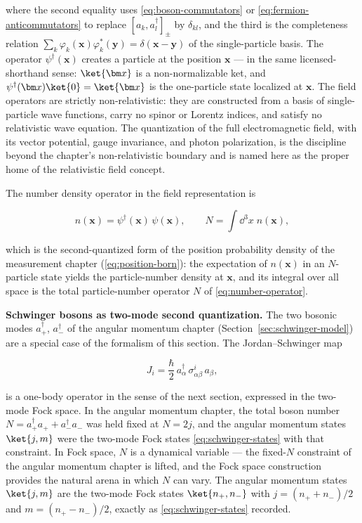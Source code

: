where the second equality uses \eqref{eq:boson-commutators} or \eqref{eq:fermion-anticommutators} to replace $[a_k, a_l^\dagger]_\pm$ by $\delta_{kl}$, and the third is the completeness relation $\sum_k \varphi_k(\bm x)\varphi_k^*(\bm y) = \delta(\bm x - \bm y)$ of the single-particle basis. The operator $\psi^\dagger(\bm x)$ creates a particle at the position $\bm x$ --- in the same licensed-shorthand sense: $\ket{\bm x}$ is a non-normalizable ket, and $\psi^\dagger(\bm x)\ket{0} = \ket{\bm x}$ is the one-particle state localized at $\bm x$. The field operators are strictly non-relativistic: they are constructed from a basis of single-particle wave functions, carry no spinor or Lorentz indices, and satisfy no relativistic wave equation. The quantization of the full electromagnetic field, with its vector potential, gauge invariance, and photon polarization, is the discipline beyond the chapter's non-relativistic boundary and is named here as the proper home of the relativistic field concept.

The number density operator in the field representation is
\begin{linenomath}
    \begin{equation}
        n(\bm x) = \psi^\dagger(\bm x)\,\psi(\bm x),
        \qquad
        N = \int\!\dd^3 x\;n(\bm x),
        \label{eq:density-operator-field}
    \end{equation}
\end{linenomath}
which is the second-quantized form of the position probability density of the measurement chapter (\eqref{eq:position-born}): the expectation of $n(\bm x)$ in an $N$-particle state yields the particle-number density at $\bm x$, and its integral over all space is the total particle-number operator $N$ of \eqref{eq:number-operator}.

\medskip\noindent\textbf{Schwinger bosons as two-mode second quantization.}
The two bosonic modes $a_+^\dagger$, $a_-^\dagger$ of the angular momentum chapter (Section~\ref{sec:schwinger-model}) are a special case of the formalism of this section. The Jordan--Schwinger map
\begin{linenomath}
    \begin{equation}
        J_i = \frac{\hbar}{2}\,a_\alpha^\dagger\,\sigma_{\alpha\beta}^i\,a_\beta,
        \label{eq:schwinger-revisited}
    \end{equation}
\end{linenomath}
is a one-body operator in the sense of the next section, expressed in the two-mode Fock space. In the angular momentum chapter, the total boson number $N = a_+^\dagger a_+ + a_-^\dagger a_-$ was held fixed at $N = 2j$, and the angular momentum states $\ket{j,m}$ were the two-mode Fock states \eqref{eq:schwinger-states} with that constraint. In Fock space, $N$ is a dynamical variable --- the fixed-$N$ constraint of the angular momentum chapter is lifted, and the Fock space construction provides the natural arena in which $N$ can vary. The angular momentum states $\ket{j,m}$ are the two-mode Fock states $\ket{n_+, n_-}$ with $j = (n_+ + n_-)/2$ and $m = (n_+ - n_-)/2$, exactly as \eqref{eq:schwinger-states} recorded.

